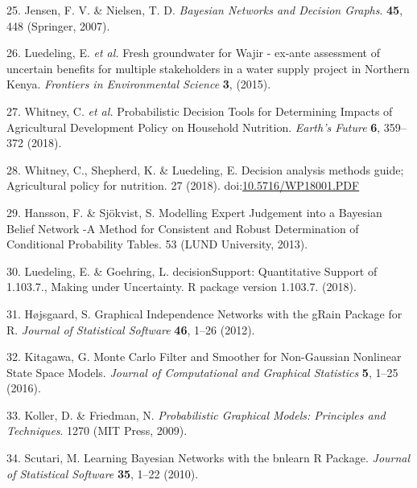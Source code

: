 \documentclass[12pt,oneside]{article}
\begin{document}
\leavevmode\hypertarget{ref-Jensen_and_Nielsen_2007}{}%
25. Jensen, F. V. \& Nielsen, T. D. \emph{Bayesian Networks and Decision
Graphs}. \textbf{45}, 448 (Springer, 2007).

\leavevmode\hypertarget{ref-Luedeling_et_al_2015}{}%
26. Luedeling, E. \emph{et al.} Fresh groundwater for Wajir - ex-ante
assessment of uncertain benefits for multiple stakeholders in a water
supply project in Northern Kenya. \emph{Frontiers in Environmental
Science} \textbf{3}, (2015).

\leavevmode\hypertarget{ref-Whitney_et_al_2018}{}%
27. Whitney, C. \emph{et al.} Probabilistic Decision Tools for
Determining Impacts of Agricultural Development Policy on Household
Nutrition. \emph{Earth's Future} \textbf{6}, 359--372 (2018).

\leavevmode\hypertarget{ref-Whitney_et_al_2018a}{}%
28. Whitney, C., Shepherd, K. \& Luedeling, E. Decision analysis methods
guide; Agricultural policy for nutrition. 27 (2018).
doi:\href{https://doi.org/10.5716/WP18001.PDF}{10.5716/WP18001.PDF}

\leavevmode\hypertarget{ref-Hansson_and_Sjokvist_2013}{}%
29. Hansson, F. \& Sjökvist, S. Modelling Expert Judgement into a
Bayesian Belief Network -A Method for Consistent and Robust
Determination of Conditional Probability Tables. 53 (LUND University,
2013).

\leavevmode\hypertarget{ref-Luedeling_and_Goehring_2018}{}%
30. Luedeling, E. \& Goehring, L. decisionSupport: Quantitative Support
of 1.103.7., Making under Uncertainty. R package version 1.103.7.
(2018).

\leavevmode\hypertarget{ref-Hojsgaard_2012}{}%
31. Højsgaard, S. Graphical Independence Networks with the gRain Package
for R. \emph{Journal of Statistical Software} \textbf{46}, 1--26 (2012).

\leavevmode\hypertarget{ref-Kitagawa_2016}{}%
32. Kitagawa, G. Monte Carlo Filter and Smoother for Non-Gaussian
Nonlinear State Space Models. \emph{Journal of Computational and
Graphical Statistics} \textbf{5}, 1--25 (2016).

\leavevmode\hypertarget{ref-Koller_and_Friedman_2009}{}%
33. Koller, D. \& Friedman, N. \emph{Probabilistic Graphical Models:
Principles and Techniques}. 1270 (MIT Press, 2009).

\leavevmode\hypertarget{ref-Scutari_2010}{}%
34. Scutari, M. Learning Bayesian Networks with the bnlearn R Package.
\emph{Journal of Statistical Software} \textbf{35}, 1--22 (2010).
\end{document}
